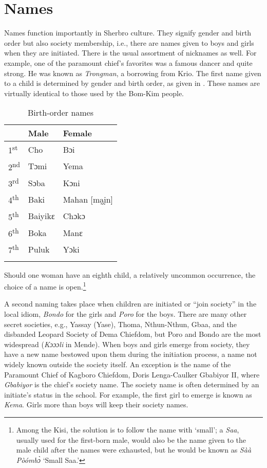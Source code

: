 \section{Names}
\label{sec:3.6} \hypertarget{Toc115517770}{}
Names function importantly in Sherbro culture. They signify gender and birth order but also society membership, i.e., there are names given to boys and girls when they are initiated. There is the usual assortment of nicknames as well. For example, one of the paramount chief's favorites was a famous dancer and quite strong. He was known as \textit{Trongman}, a borrowing from Krio. The first name given to a child is determined by gender and birth order, as given in . These names are virtually identical to those used by the Bom-Kim people.

\begin{table}
\caption{\label{tab:wordcat:18}Birth-order names}

\begin{tabular}{lll}
\lsptoprule
& Male & Female\\
\midrule
1\textsuperscript{st} & Cho & Bɔi\\
2\textsuperscript{nd} & Tɔmi & Yema\\
3\textsuperscript{rd} & Sɔba & Kɔni\\
4\textsuperscript{th} & Baki & Mahan [ma̰ḭn]\\
5\textsuperscript{th} & Baiyikɛ & Chɔkɔ\\
6\textsuperscript{th} & Boka & Manɛ\\
7\textsuperscript{th} & Puluk & Yɔki\\
\lspbottomrule
\end{tabular}
\end{table}

Should one woman have an eighth child, a relatively uncommon occurrence, the choice of a name is open.\footnote{Among the Kisi, the solution is to follow the name with ‘small'; a \textit{Saa}, usually used for the first-born male, would also be the name given to the male child after the names were exhausted, but he would be known as \textit{Sàà Pòómbɔ̀} ‘Small Saa.'}

A second naming takes place when children are initiated or “join society” in the local idiom, \textit{Bondo} for the girls and \textit{Poro} for the boys. There are many other secret societies, e.g., Yassay (Yase), Thoma, Nthun-Nthun, Gbaa, and the disbanded Leopard Society of Dema Chiefdom, but Poro and Bondo are the most widespread (\textit{Kɔɔɔli} in Mende). When boys and girls emerge from society, they have a new name bestowed upon them during the initiation process, a name not widely known outside the society itself. An exception is the name of the Paramount Chief of Kagboro Chiefdom, Doris Lenga-Caulker Gbabiyor II, where \textit{Gbabiyor} is the chief's society name. The society name is often determined by an initiate's status in the school. For example, the first girl to emerge is known as \textit{Kema}. Girls more than boys will keep their society names.

